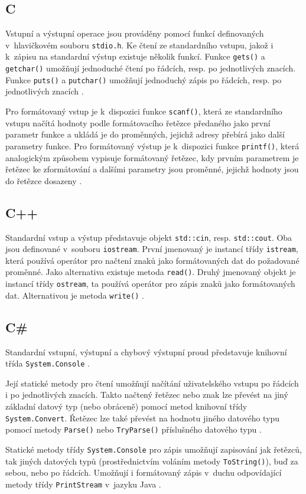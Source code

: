\documentclass[onepage, a4paper, 12pt]{bakalarka}
\begin{document}
\subsection{C}
Vstupní a výstupní operace jsou prováděny pomocí funkcí definovaných v~hlavičkovém souboru \texttt{stdio.h}. Ke čtení ze standardního vstupu, jakož i k~zápisu na standardní výstup existuje několik funkcí. Funkce \texttt{gets()} a \texttt{getchar()} umožňují jednoduché čtení po řádcích, resp. po jednotlivých znacích. Funkce \texttt{puts()} a \texttt{putchar()} umožňují jednoduchý zápis po řádcích, resp. po jednotlivých znacích \cite{cpp-guide-cstdio}.\par
Pro formátovaný vstup je k~dispozici funkce \texttt{scanf()}, která ze standardního vstupu načítá hodnoty podle formátovacího řetězce předaného jako první parametr funkce a ukládá je do proměnných, jejichž adresy přebírá jako další parametry funkce. Pro formátovaný výstup je k~dispozici funkce \texttt{printf()}, která analogickým způsobem vypisuje formátovaný řetězec, kdy prvním parametrem je řetězec ke zformátování a dalšími parametry jsou proměnné, jejichž hodnoty jsou do řetězce dosazeny \cite{cpp-guide-scanf, cpp-guide-printf}.

\subsection{C++}
Standardní vstup a výstup představuje objekt \texttt{std::cin}, resp. \texttt{std::cout}. Oba jsou definované v~souboru \texttt{iostream}. První jmenovaný je instancí třídy \texttt{istream}, která používá operátor \uv{$>>$} pro načtení znaků jako formátovaných dat do požadované proměnné. Jako alternativa existuje metoda \texttt{read()}. Druhý jmenovaný objekt je instancí třídy \texttt{ostream}, ta používá operátor \uv{$<<$} pro zápis znaků jako formátovaných dat. Alternativou je metoda \texttt{write()} \cite{cpp-guide-iostream, cpp-guide-stdcin, cpp-guide-stdcout}.

\subsection{C\#}
Standardní vstupní, výstupní a chybový výstupní proud představuje knihovní třída \texttt{System.Console} \cite{cs-guide-console}.\par 
Její statické metody pro čtení umožňují načítání uživatelského vstupu po řádcích i po jednotlivých znacích. Takto načtený řetězec nebo znak lze převést na jiný základní datový typ (nebo obráceně) pomocí metod knihovní třídy \texttt{System.Convert}. Řetězec lze také převést na hodnotu jiného datového typu pomocí metody \texttt{Parse()} nebo \texttt{TryParse()} příslušného datového typu \cite{cs-guide-convert, cs-guide-sbyte, cs-guide-short, cs-guide-int, cs-guide-long, cs-guide-float, cs-guide-double, cs-guide-bool, cs-guide-char}.\par
Statické metody třídy \texttt{System.Console} pro zápis umožňují zapisování jak řetězců, tak jiných datových typů (prostřednictvím voláním metody \newline\texttt{ToString()}), buď za sebou, nebo po řádcích. Umožňují i formátovaný zápis v~duchu odpovídající metody třídy \texttt{PrintStream} v~jazyku Java \cite{cs-guide-console}.
\end{document}
